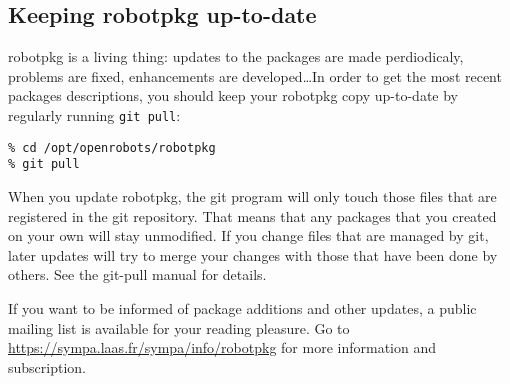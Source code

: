 \subsection{Keeping robotpkg up-to-date} %

robotpkg is  a living  thing: updates  to the packages  are made  perdiodicaly,
problems are fixed,  enhancements are developed\ldots  In order to get the most
recent packages descriptions, you should keep your robotpkg copy up-to-date by
regularly running {\tt git pull}:

\begin{verbatim}
% cd /opt/openrobots/robotpkg
% git pull
\end{verbatim}

When you update robotpkg, the git program will only  touch those files that are
registered in the git repository. That means that any packages that you created
on your own will stay unmodified. If you change files that  are managed by git,
later updates will try to merge your changes with  those that have been done by
others. See the git-pull manual for details.

If you want  to be informed  of package additions  and other  updates, a public
mailing    list  is   available    for   your    reading   pleasure.  Go     to
\url{https://sympa.laas.fr/sympa/info/robotpkg}    for   more  information  and
subscription.
